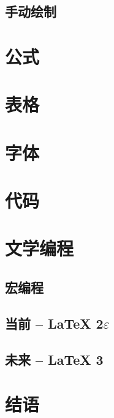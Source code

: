 \documentclass[12pt]{article}
\begin{document}
\subsection{手动绘制}





\section{公式}



\section{表格}




\section{字体}



\section{代码}


\section{文学编程}

\subsection{宏编程}

\subsection{当前 -- \LaTeX{} 2$\varepsilon$}


\subsection{未来 -- \LaTeX{} 3 }




\section{结语}
\end{document}
